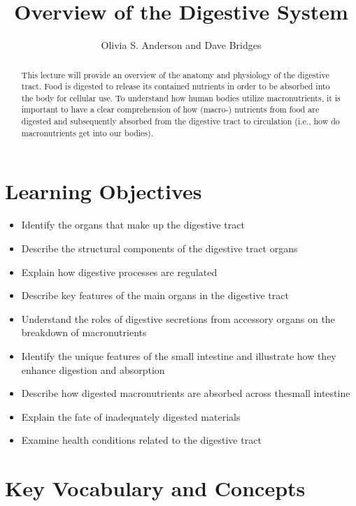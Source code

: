 \documentclass{tufte-handout}
\title{Overview of the Digestive System}
\author{Olivia S. Anderson and Dave Bridges}
\date{}  %
\begin{document}
\maketitle%

\begin{abstract}
\noindent This lecture will provide an overview of the anatomy and physiology of the digestive tract. Food is digested to release its contained nutrients in order to be absorbed into the body for cellular use. To understand how human bodies utilize macronutrients, it is important to have a clear
comprehension of how (macro-) nutrients from food are digested and subsequently absorbed from the digestive tract to circulation (i.e., how do
macronutrients get into our bodies). 
\end{abstract}

\tableofcontents

\pagebreak
\section{Learning Objectives}

\begin{itemize}
\item Identify the organs that make up the digestive tract
\item Describe the structural components of the digestive tract organs
\item Explain how digestive processes are regulated
\item Describe key features of the main organs in the digestive tract
\item Understand the roles of digestive secretions from accessory organs on the breakdown of macronutrients
\item Identify the unique features of the small intestine and illustrate how they enhance digestion and absorption
\item Describe how digested macronutrients are absorbed across thesmall intestine
\item Explain the fate of inadequately digested materials
\item Examine health conditions related to the digestive tract

\end{itemize}

\section{Key Vocabulary and Concepts}
\end{document}

